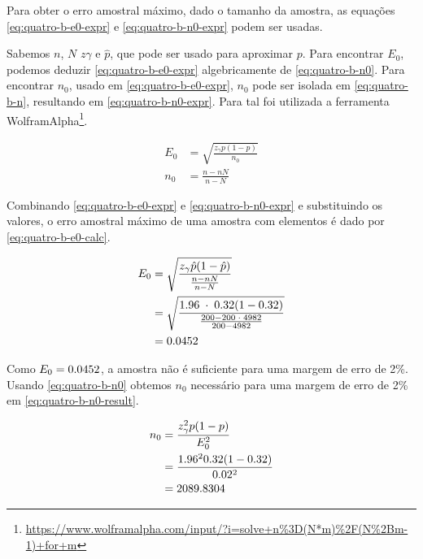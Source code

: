 Para obter o erro amostral máximo, dado o tamanho da amostra, as equações \eqref{eq:quatro-b-e0-expr} e \eqref{eq:quatro-b-n0-expr} podem ser usadas. 

Sabemos $n$, $N$ $z\gamma$ e $\hat{p}$, que pode ser usado para aproximar $p$. Para encontrar $E_0$, podemos deduzir \eqref{eq:quatro-b-e0-expr} algebricamente de \eqref{eq:quatro-b-n0}. Para encontrar $n_0$, usado em \eqref{eq:quatro-b-e0-expr}, $n_0$ pode ser isolada em \eqref{eq:quatro-b-n}, resultando em \eqref{eq:quatro-b-n0-expr}. Para tal foi utilizada a ferramenta WolframAlpha\footnote{\url{https://www.wolframalpha.com/input/?i=solve+n\%3D(N*m)\%2F(N\%2Bm-1)+for+m}}.

\begin{align}
	E_0 &= \label{eq:quatro-b-e0-expr}
	       \sqrt{\frac{z_\gamma p(1 - p) }{n_0}} \\
	n_0 &= \label{eq:quatro-b-n0-expr}
	       \frac{n-n N}{n-N}
\end{align}

Combinando \eqref{eq:quatro-b-e0-expr} e \eqref{eq:quatro-b-n0-expr} e substituindo os valores, o erro amostral máximo de uma amostra com \QUATROn elementos é dado por \eqref{eq:quatro-b-e0-calc}.

\begin{align}
	\label{eq:quatro-b-e0-calc}
	E_0 &= \sqrt{\frac{z_\gamma \hat{p}(1 - \hat{p}) }{\frac{n-n N}{n - N}}} \\
	    &= \sqrt{\frac{1.96 \;\cdot\; 0.32 (1 - 0.32) }{\frac{200 - 200 \;\cdot\; 4982}{200 - 4982}}} \nonumber \\
	    &= 0.0452 \nonumber
\end{align}

Como $E_0 = 0.0452$, a amostra não é suficiente para uma margem de erro de 2\%. Usando \eqref{eq:quatro-b-n0} obtemos $n_0$ necessário para uma margem de erro de 2\% em \eqref{eq:quatro-b-n0-result}.

\begin{align}
	n_0 &= \frac{z_\gamma^2 p(1-p)}{E_0^2} \nonumber \\
	    &= \frac{1.96^2 0.32(1-0.32)}{0.02^2} \nonumber \\
	    &= \label{eq:quatro-b-n0-result}
	       2089.8304	
\end{align}

